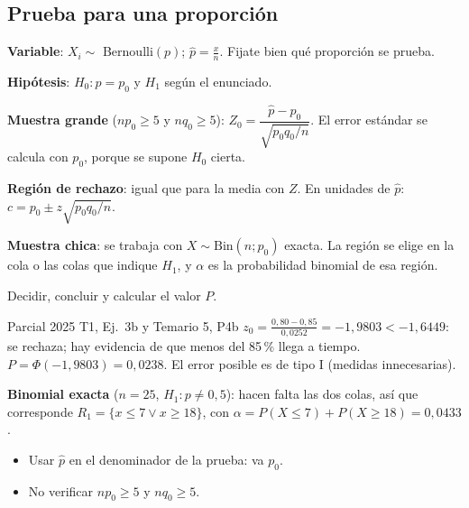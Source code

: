 \subsection{Prueba para una proporción}\label{p:pp}
\begin{pasos}
\begin{pasolista}
\item \textbf{Variable}: $X_i\sim$ Bernoulli$(p)$; $\hat p=\frac{x}{n}$. Fijate bien qué proporción se prueba.
\item \textbf{Hipótesis}: $H_0:p=p_0$ y $H_1$ según el enunciado.
\item \textbf{Muestra grande} ($np_0\ge5$ y $nq_0\ge5$): $Z_0=\dfrac{\hat p-p_0}{\sqrt{p_0q_0/n}}$. El error estándar se calcula con $p_0$, porque se supone $H_0$ cierta.
\item \textbf{Región de rechazo}: igual que para la media con $Z$. En unidades de $\hat p$: $c=p_0\pm z\sqrt{p_0q_0/n}$.
\item \textbf{Muestra chica}: se trabaja con $X\sim\mathrm{Bin}(n;p_0)$ exacta. La región se elige en la cola o las colas que indique $H_1$, y $\alpha$ es la probabilidad binomial de esa región.
\item Decidir, concluir y calcular el valor $P$.
\end{pasolista}
\end{pasos}
\begin{modelo}{Parcial 2025 T1, Ej.\ 3b y Temario 5, P4b}
$z_0=\frac{0{,}80-0{,}85}{0{,}0252}=-1{,}9803<-1{,}6449$: se rechaza; hay evidencia de que menos del 85\,\% llega a tiempo. $P=\Phi(-1{,}9803)=0{,}0238$. El error posible es de tipo I (medidas innecesarias).

\textbf{Binomial exacta} ($n=25$, $H_1:p\neq0{,}5$): hacen falta las dos colas, así que corresponde $R_1=\{x\le7\vee x\ge18\}$, con $\alpha=P(X\le7)+P(X\ge18)=0{,}0433$.
\end{modelo}
\begin{ojo}
\begin{itemize}
\item Usar $\hat p$ en el denominador de la prueba: va $p_0$.
\item No verificar $np_0\ge5$ y $nq_0\ge5$.
\end{itemize}
\end{ojo}

